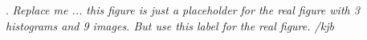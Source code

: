 \label{fig:BlueGreenRed}. \textit{Replace me ... this figure is just a placeholder for the real figure with 3 histograms and 9 images. But use this label for the real figure. /kjb}
